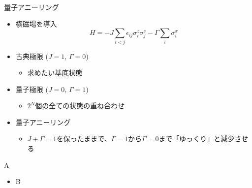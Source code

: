 \begin{frame}[t,fragile]{量子アニーリング}
  \begin{itemize}
  \item 横磁場を導入
    \[
    H = -J \sum_{i<j} \epsilon_{ij} \sigma_i^z \sigma_j^z - \Gamma \sum_i \sigma_i^x
    \]
  \item 古典極限 ($J=1$, $\Gamma=0$)
    \begin{itemize}
    \item 求めたい基底状態
    \end{itemize}
  \item 量子極限 ($J=0$, $\Gamma=1$)
    \begin{itemize}
    \item $2^N$個の全ての状態の重ね合わせ
    \end{itemize}
  \item 量子アニーリング
    \begin{itemize}
    \item $J+\Gamma=1$を保ったままで、$\Gamma=1$から$\Gamma=0$まで「ゆっくり」と減少させる
    \end{itemize}
    
  \end{itemize}
\end{frame}

\begin{frame}[t,fragile]{A}
  \begin{itemize}
  \item B
  \end{itemize}
\end{frame}
